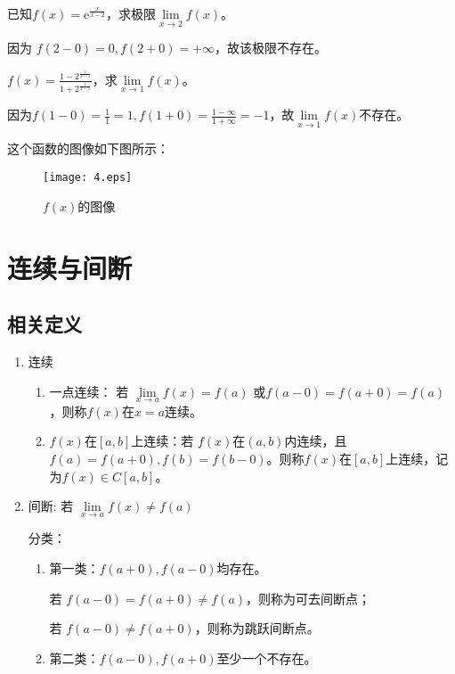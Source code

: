         \begin{example}
            已知$ f(x)=\mathrm{e}^{\frac{x}{x-2}}$，求极限$\lim\limits_{x \to 2}f(x)$。
        \end{example}

        \begin{solution}
            因为 $f(2-0)=0 , f(2+0)=+\infty$，故该极限不存在。
        \end{solution}

        \begin{example}
            $f(x)=\displaystyle\frac{1-2^{\frac{1}{x-1}}}{1+2^{\frac{1}{x-1}}}$，求$\lim\limits_{x \to 1}f(x)$。
        \end{example}

        \begin{solution}
            因为$f(1-0)=\displaystyle\frac{1}{1}=1, f(1+0)=\displaystyle\frac{1-\infty}{1+\infty}=-1$，故$\lim\limits_{x \to 1}f(x)$不存在。
        \end{solution}
        这个函数的图像如下图所示：
        \begin{figure}[htbp]
            \centering
            \texttt{[image: 4.eps]}
            \caption{$f(x)$的图像}
          \end{figure}

          \section{连续与间断}
          \subsection{相关定义}
          \begin{enumerate}
              \item 连续
              \begin{enumerate}
                  \item 一点连续：
                  若 $\lim\limits_{x \to a}f(x)=f(a)$ 或$f(a-0)=f(a+0)=f(a)$，则称$f(x)$在$x = a$连续。
                  \item $f(x)$在$[a,b]$上连续：若 $f(x)$在$(a,b)$内连续，且$f(a)=f(a+0),f(b)=f(b-0)$。则称$f(x)$在$[a,b]$上连续，记为$f(x)\in C[a,b]$。
              \end{enumerate}
              \item 间断: 若 $\lim\limits_{x \to a}f(x)\neq f(a)$
              
              分类：
              \begin{enumerate}
                  \item 第一类：$f(a+0),f(a-0)$均存在。
                  
                  若 $f(a-0)=f(a+0)\neq f(a)$，则称为可去间断点；

                  若 $f(a-0)\neq f(a+0)$，则称为跳跃间断点。
                  \item 第二类：$f(a-0),f(a+0)$至少一个不存在。
              \end{enumerate}
          \end{enumerate}

